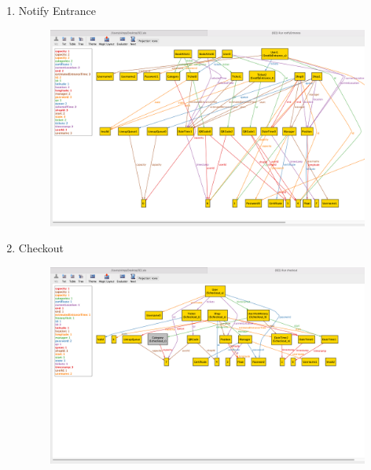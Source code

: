\begin{enumerate}
	\item Notify Entrance \\
	\begin{figure}[H]
		\centering
		\includegraphics[width=0.9\textheight,keepaspectratio, angle=90]{images/alloy_notifyEntrance.png}
	\end{figure}
	\clearpage

	\item Checkout \\
	\begin{figure}[H]
		\centering
		\includegraphics[width=0.9\textheight,keepaspectratio, angle=90]{images/alloy_checkout.png}
	\end{figure}
	\clearpage
\end{enumerate}
